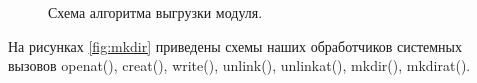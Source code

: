 \documentclass[a4paper,14pt]{article}
\begin{document}
\newpage
\begin{figure}[!h]
    \caption{Схема алгоритма выгрузки модуля.}
    \label{fig:unload}
\end{figure}

На рисунках \ref{fig:mkdir} приведены схемы наших обработчиков системных вызовов openat(), creat(), write(), unlink(), unlinkat(), mkdir(), mkdirat().
\end{document}
